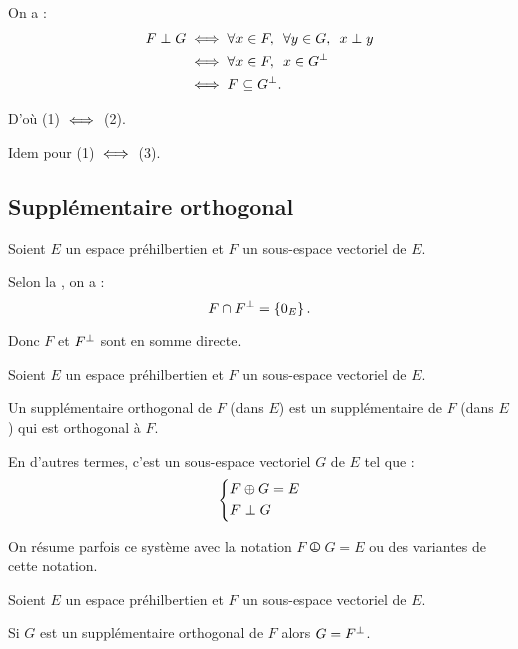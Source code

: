 \begin{dem}
On a : \[\begin{aligned}
F\perp G&\ssi\quantifs{\forall x\in F;\forall y\in G}x\perp y \\
&\ssi\quantifs{\forall x\in F}x\in G\ortho \\
&\ssi F\subset G\ortho.
\end{aligned}\]

D'où (1) \(\iff\) (2).

Idem pour (1) \(\iff\) (3).
\end{dem}

\subsection{Supplémentaire orthogonal}

\begin{rappel}
Soient \(E\) un espace préhilbertien et \(F\) un sous-espace vectoriel de \(E\).

Selon la , on a : \[F\cap F^{\perp}=\left\lbrace0_E\right\rbrace.\]

Donc \(F\) et \(F^{\perp}\) sont en somme directe.
\end{rappel}

\begin{defi}
Soient \(E\) un espace préhilbertien et \(F\) un sous-espace vectoriel de \(E\).

Un supplémentaire orthogonal de \(F\) (dans \(E\)) est un supplémentaire de \(F\) (dans \(E\)) qui est orthogonal à \(F\).

En d'autres termes, c'est un sous-espace vectoriel \(G\) de \(E\) tel que : \[\begin{dcases}
F\oplus G=E \\
F\perp G
\end{dcases}\]

On résume parfois ce système avec la notation \(F\operp G=E\) ou des variantes de cette notation.
\end{defi}

\begin{prop}
Soient \(E\) un espace préhilbertien et \(F\) un sous-espace vectoriel de \(E\).

Si \(G\) est un supplémentaire orthogonal de \(F\) alors \(G=F^{\perp}\).
\end{prop}

